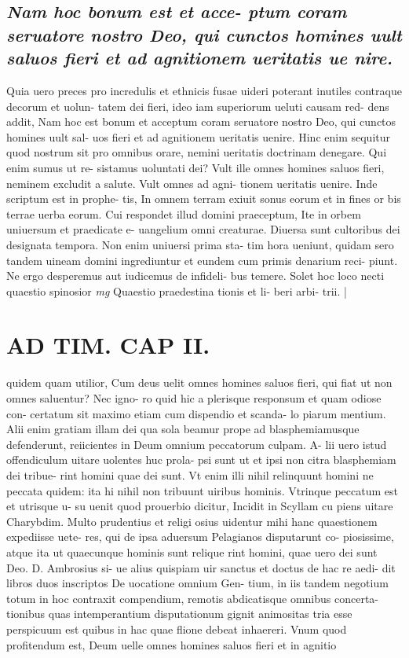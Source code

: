 \documentclass{article}
\begin{document}
\begin{pages}
\subsection*{\textit{Nam hoc bonum est et acce- ptum coram seruatore nostro Deo, qui cunctos homines uult saluos fieri et ad agnitionem ueritatis ue nire. }}\pstart Quia uero preces pro incredulis et ethnicis fusae uideri poterant inutiles contraque decorum et uolun- tatem dei fieri, ideo iam superiorum ueluti causam red- dens addit, Nam hoc est bonum et acceptum coram seruatore nostro Deo, qui cunctos homines uult sal- uos fieri et ad agnitionem ueritatis uenire. Hinc enim sequitur quod nostrum sit pro omnibus orare, nemini ueritatis doctrinam denegare. Qui enim sumus ut re- sistamus uoluntati dei? Vult ille omnes homines saluos fieri, neminem excludit a salute. Vult omnes ad agni- tionem ueritatis uenire. Inde scriptum est in prophe- tis, In omnem terram exiuit sonus eorum et in fines or bis terrae uerba eorum. Cui respondet illud domini praeceptum, Ite in orbem uniuersum et praedicate e- uangelium omni creaturae. Diuersa sunt cultoribus dei designata tempora. Non enim uniuersi prima sta- tim hora ueniunt, quidam sero tandem uineam domini ingrediuntur et eundem cum primis denarium reci- piunt. Ne ergo desperemus aut iudicemus de infideli- bus temere. Solet hoc loco necti quaestio spinosior  \pend
\textit{mg}
\footnotesize Quaestio praedestina tionis et li- beri arbi- trii. 
\normalsize| 
\section*{AD TIM. CAP II. }
\marginpar{[ p.113 ]}\pstart quidem quam utilior, Cum deus uelit omnes homines saluos fieri, qui fiat ut non omnes saluentur? Nec igno- ro quid hic a plerisque responsum et quam odiose con- certatum sit maximo etiam cum dispendio et scanda- lo piarum mentium. Alii enim gratiam illam dei qua sola beamur prope ad blasphemiamusque defenderunt, reiicientes in Deum omnium peccatorum culpam. A- lii uero istud offendiculum uitare uolentes huc prola- psi sunt ut et ipsi non citra blasphemiam dei tribue- rint homini quae dei sunt. Vt enim illi nihil relinquunt homini ne peccata quidem: ita hi nihil non tribuunt uiribus hominis. Vtrinque peccatum est et utrisque u- su uenit quod prouerbio dicitur, Incidit in Scyllam cu piens uitare Charybdim. Multo prudentius et religi osius uidentur mihi hanc quaestionem expediisse uete- res, qui de ipsa aduersum Pelagianos disputarunt co- piosissime, atque ita ut quaecunque hominis sunt relique rint homini, quae uero dei sunt Deo. D. Ambrosius si- ue alius quispiam uir sanctus et doctus de hac re aedi- dit libros duos inscriptos De uocatione omnium Gen- tium, in iis tandem negotium totum in hoc contraxit compendium, remotis abdicatisque omnibus concerta- tionibus quas intemperantium disputationum gignit animositas tria esse perspicuum est quibus in hac quae flione debeat inhaereri. Vnum quod profitendum est, Deum uelle omnes homines saluos fieri et in agnitio  \pend

\end{pages}
\end{document}
